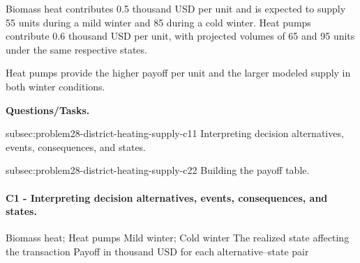 	Biomass heat contributes 0.5 thousand USD per unit and is expected to supply 55 units during a mild winter and 85 during a cold winter. Heat pumps contribute 0.6 thousand USD per unit, with projected volumes of 65 and 95 units under the same respective states.
	
	Heat pumps provide the higher payoff per unit and the larger modeled supply in both winter conditions.

	\textbf{Questions/Tasks.}
	\begin{enumerate}
	\CriterionTask
	{subsec:problem28-district-heating-supply-c1}{1}
	{Interpreting decision alternatives, events, consequences, and states.}

	\CriterionTask
	{subsec:problem28-district-heating-supply-c2}{2}
	{Building the payoff table.}
	\end{enumerate}

\paragraph*{C1 - Interpreting decision alternatives, events, consequences, and states.}
	\label{subsec:problem28-district-heating-supply-c1}
	\DecisionElementsTable
	{Biomass heat; Heat pumps}
	{Mild winter; Cold winter}
	{The realized state affecting the transaction}
	{Payoff in thousand USD for each alternative--state pair}

